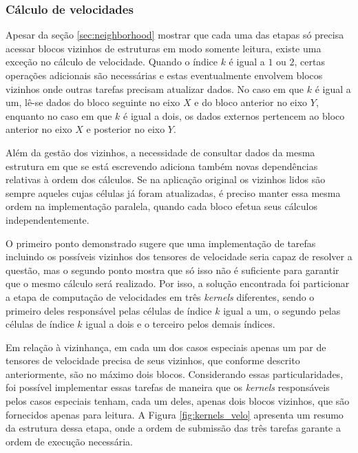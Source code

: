 \documentclass[cic,tc]{iiufrgs}
\begin{document}
\subsubsection{Cálculo de velocidades}
Apesar da seção \ref{sec:neighborhood} mostrar que cada uma das etapas só precisa acessar blocos vizinhos de estruturas em modo somente leitura, existe
uma exceção no cálculo de velocidade. Quando o índice $k$ é igual a $1$ ou $2$, certas operações adicionais são necessárias e estas
eventualmente envolvem blocos vizinhos onde outras tarefas precisam atualizar dados. No caso em que $k$ é igual a um, lê-se dados
do bloco seguinte no eixo $X$ e do bloco anterior no eixo $Y$, enquanto no caso em que $k$ é igual a dois, os dados externos pertencem
ao bloco anterior no eixo $X$ e posterior no eixo $Y$. 

Além da gestão dos vizinhos, a necessidade de consultar dados da mesma estrutura em que se está escrevendo adiciona também novas
dependências relativas à ordem dos cálculos. Se na aplicação original os vizinhos lidos são sempre aqueles cujas células já
foram atualizadas, é preciso manter essa mesma ordem na implementação paralela, quando cada bloco efetua seus cálculos independentemente.

O primeiro ponto demonstrado sugere que uma implementação de tarefas incluindo os possíveis vizinhos dos tensores de velocidade
seria capaz de resolver a questão, mas o segundo ponto mostra que só isso não é suficiente para garantir que o mesmo cálculo será
realizado. Por isso, a solução encontrada foi particionar a etapa de computação de velocidades em três \textit{kernels} diferentes, sendo
o primeiro deles responsável pelas células de índice $k$ igual a um, o segundo pelas células de índice $k$ igual a dois e o terceiro pelos
demais índices.

Em relação à vizinhança, em cada um dos casos especiais apenas um par de tensores de velocidade precisa de seus vizinhos, que conforme
descrito anteriormente, são no máximo dois blocos. Considerando essas particularidades, foi possível implementar essas tarefas de
maneira que os \textit{kernels} responsáveis pelos casos especiais tenham, cada um deles, apenas dois blocos vizinhos, que são fornecidos
apenas para leitura. A Figura \ref{fig:kernels_velo} apresenta um resumo da estrutura dessa etapa, onde a ordem de submissão das três
tarefas garante a ordem de execução necessária.
\end{document}
